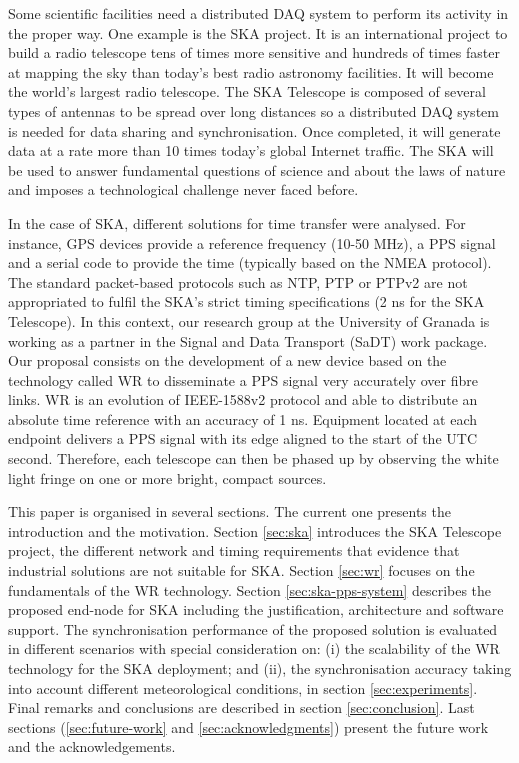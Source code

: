 Some scientific facilities need a distributed DAQ system to perform its activity in the proper way. One example is the SKA \cite{ska:project_website} project. It is an international project to build a radio telescope tens of times more sensitive and hundreds of times faster at mapping the sky than today's best radio astronomy facilities. It will become the world's largest radio telescope. The SKA Telescope is composed of several types of antennas to be spread over long distances so a distributed DAQ system is needed for data sharing and synchronisation. Once completed, it will generate data at a rate more than 10 times today’s global Internet traffic. The SKA will be used to answer fundamental questions of science and about the laws of nature and imposes a technological challenge never faced before.

In the case of SKA, different solutions for time transfer were analysed. For instance, GPS devices provide a reference frequency (10-50 MHz), a PPS signal and a serial code to provide the time (typically based on the NMEA protocol). The standard packet-based protocols such as NTP, PTP or PTPv2 are not appropriated to fulfil the SKA's strict timing specifications (2 ns for the SKA Telescope).
In this context, our research group at the University of Granada is working as a partner in the Signal and Data Transport (SaDT) \cite{ska:sadt_website} work package. Our proposal consists on the development of a new device based on the technology called WR \cite{ohwr:wr_wiki} to disseminate a PPS signal very accurately over fibre links. WR is an evolution of IEEE-1588v2 protocol and able to distribute an absolute time reference with an accuracy of 1 ns. Equipment located at each endpoint delivers a PPS signal with its edge aligned to the start of the UTC second. Therefore, each telescope can then be phased up by observing the white light fringe on one or more bright, compact sources.

This paper is organised in several sections. The current one 
presents the introduction and the motivation. Section \ref{sec:ska} introduces 
the SKA Telescope project, the different network and timing requirements that 
evidence that industrial solutions are not suitable for SKA. Section 
\ref{sec:wr} focuses on the fundamentals of the WR technology. Section 
\ref{sec:ska-pps-system} describes the proposed end-node for SKA including the 
justification, architecture and software support. The synchronisation 
performance of the proposed solution is evaluated in different scenarios with 
special consideration on: (i) the scalability of the WR technology for the SKA 
deployment; and (ii), the synchronisation accuracy taking into account 
different meteorological conditions, in section \ref{sec:experiments}. Final 
remarks and conclusions are described in section \ref{sec:conclusion}. Last 
sections (\ref{sec:future-work} and \ref{sec:acknowledgments}) present the 
future work and the acknowledgements.


